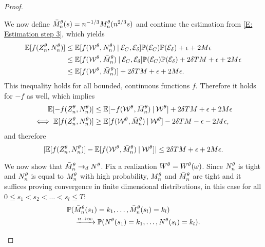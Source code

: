 \begin{proof}
\begin{proofpart}
We now define $\bar{M}_n^{\theta}(s) = n^{-1 / 3} M_n^{\theta}(n^{2 / 3}s)$ and continue the estimation from \eqref{E: Estimation step 3},
which yields
\begin{equation} \label{E: Estimation step 4}
\begin{aligned}
\mathbb{E}[f(Z_n^{\theta}, N_n^{\theta})] 
&\leq \mathbb{E}[f(\mathcal{W}^{\theta}, N_n^{\theta}) \: | \: \mathcal{E}_{C}, \mathcal{E}_{\delta}]\mathbb{P}(\mathcal{E}_{C})\mathbb{P}(\mathcal{E}_{\delta}) + \epsilon + 2M\epsilon   \\
&\leq \mathbb{E}[f(\mathcal{W}^{\theta}, \bar{M}_n^{\theta}) \: | \: \mathcal{E}_{C}, \mathcal{E}_{\delta}]\mathbb{P}(\mathcal{E}_{C})\mathbb{P}(\mathcal{E}_{\delta}) + 2\delta T M + \epsilon  + 2M\epsilon \\
&\leq \mathbb{E}[f(\mathcal{W}^{\theta}, \bar{M}_n^{\theta})] + 2\delta T M + \epsilon  + 2M\epsilon.
\end{aligned}
\end{equation}
This inequality holds for all bounded, continuous functions $f$. 
Therefore it holds for $-f$ as well, which implies
\begin{equation}
\begin{aligned}
\mathbb{E}[-f(Z_n^{\theta}, N_n^{\theta})] &\leq \mathbb{E}[-f(\mathcal{W}^{\theta}, \bar{M}_n^{\theta}) \: | \: \mathcal{W}^{\theta}]+ 2\delta T M  + \epsilon + 2M\epsilon \\
\iff  \mathbb{E}[f(Z_n^{\theta}, N_n^{\theta})] &\geq \mathbb{E}[f(\mathcal{W}^{\theta}, \bar{M}_n^{\theta}) \: | \: \mathcal{W}^{\theta}] - 2\delta T M  - \epsilon - 2M\epsilon,
\end{aligned}
\end{equation}
and therefore
\begin{equation} \label{E: Equality of Expectations}
	|\mathbb{E}[f(Z_n^{\theta}, N_n^{\theta})] - \mathbb{E}[f(\mathcal{W}^{\theta}, \bar{M}_n^{\theta}) \: | \: \mathcal{W}^{\theta}] | \leq 2\delta T M + \epsilon  + 2M\epsilon.
\end{equation}
\end{proofpart}



\begin{proofpart}
We now show that $\bar{M}_n^{\theta} \rightarrow_d N^{\theta}$.
Fix a realization $W^{\theta} = W^{\theta}(\omega)$.
Since $N_n^{\theta}$ is tight and $N_n^{\theta}$ is equal to $M_n^{\theta}$ with high probability,
$M_n^{\theta}$ and $\bar{M}_n^{\theta}$ are tight and it suffices proving convergence in finite dimensional distributions,
in this case for all $0 \leq s_1 < s_2 < \dots < s_l \leq T$:
\begin{equation} \label{E: convergence fdd}
\begin{aligned}
&\mathbb{P}( \bar{M}_n^{\theta}(s_1) = k_1, \dots, \bar{M}_n^{\theta}(s_l) = k_l ) \\
&\quad \xrightarrow{n \rightarrow \infty}  \mathbb{P}( N^{\theta}(s_1) = k_1, \dots, N^{\theta}(s_l) = k_l ).
\end{aligned}
\end{equation}


\end{proofpart}
\end{proof}
